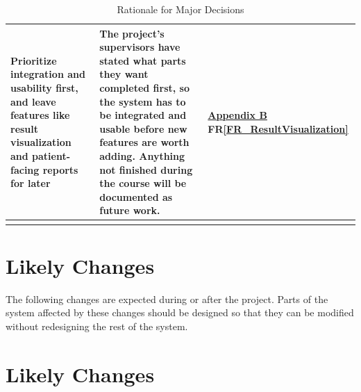\documentclass[12pt]{article}
\newcommand{\rref}[1]{FR\ref{#1}}
\begin{document}
\begin{longtable}{>{\raggedright\arraybackslash}p{} >{\raggedright\arraybackslash}p{} >{\raggedright\arraybackslash}p{}}
\midrule
Prioritize integration and usability first, and leave features like result visualization and patient-facing reports for later & 
The project's supervisors have stated what parts they want completed first, so the system has to be integrated and usable before new features are worth adding. Anything not finished during the course will be documented as future work. & \hyperref[sec:AppendixB]{Appendix B} \newline \rref{FR_ResultVisualization}\\
\bottomrule
\caption{Rationale for Major Decisions} \label{tab:Rationale}
\end{longtable}

\section{Likely Changes}    
The following changes are expected during or after the project. Parts of the
system affected by these changes should be designed so that they can be modified
without redesigning the rest of the system.

\section{Likely Changes}    
\end{document}
